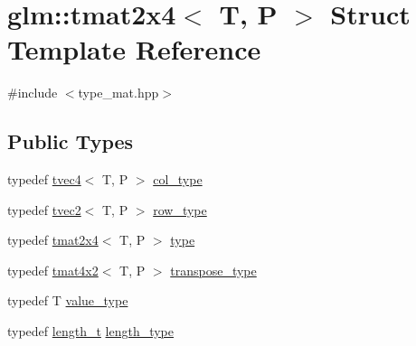 \hypertarget{structglm_1_1tmat2x4}{}\section{glm\+::tmat2x4$<$ T, P $>$ Struct Template Reference}
\label{structglm_1_1tmat2x4}


{\ttfamily \#include $<$type\+\_\+mat.\+hpp$>$}

\subsection*{Public Types}
\begin{DoxyCompactItemize}
\item 
typedef \mbox{\hyperlink{structglm_1_1tvec4}{tvec4}}$<$ T, P $>$ \mbox{\hyperlink{structglm_1_1tmat2x4_a9effcccd2c4c50c385e4c3a2fe2feedb}{col\+\_\+type}}
\item 
typedef \mbox{\hyperlink{structglm_1_1tvec2}{tvec2}}$<$ T, P $>$ \mbox{\hyperlink{structglm_1_1tmat2x4_a3c55d4a9be73c34967ab6f5010d8ae70}{row\+\_\+type}}
\item 
typedef \mbox{\hyperlink{structglm_1_1tmat2x4}{tmat2x4}}$<$ T, P $>$ \mbox{\hyperlink{structglm_1_1tmat2x4_a37444455c9e8f7e00973c990eec0ff21}{type}}
\item 
typedef \mbox{\hyperlink{structglm_1_1tmat4x2}{tmat4x2}}$<$ T, P $>$ \mbox{\hyperlink{structglm_1_1tmat2x4_a00436dc5f11ba5e0bda1286402ded8be}{transpose\+\_\+type}}
\item 
typedef T \mbox{\hyperlink{structglm_1_1tmat2x4_a3d43dfa1bcb8be0ad095350ee71b972e}{value\+\_\+type}}
\item 
typedef \mbox{\hyperlink{namespaceglm_a090a0de2260835bee80e71a702492ed9}{length\+\_\+t}} \mbox{\hyperlink{structglm_1_1tmat2x4_a8d8156b982138c22047082ca7a8f9009}{length\+\_\+type}}
\end{DoxyCompactItemize}

